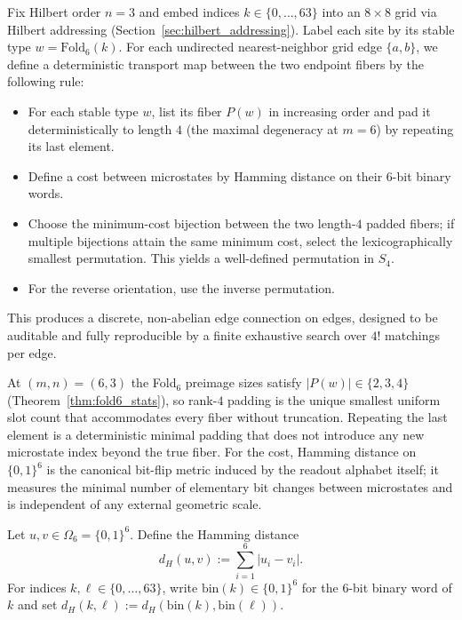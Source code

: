 Fix Hilbert order $n=3$ and embed indices $k\in\{0,\dots,63\}$ into an $8\times 8$ grid via Hilbert addressing (Section~\ref{sec:hilbert_addressing}).
Label each site by its stable type $w=\mathrm{Fold}_6(k)$.
For each undirected nearest-neighbor grid edge $\{a,b\}$, we define a deterministic transport map between the two endpoint fibers by the following rule:
\begin{itemize}
\item For each stable type $w$, list its fiber $P(w)$ in increasing order and pad it deterministically to length $4$ (the maximal degeneracy at $m=6$) by repeating its last element.
\item Define a cost between microstates by Hamming distance on their $6$-bit binary words.
\item Choose the minimum-cost bijection between the two length-$4$ padded fibers; if multiple bijections attain the same minimum cost, select the lexicographically smallest permutation. This yields a well-defined permutation in $S_4$.
\item For the reverse orientation, use the inverse permutation.
\end{itemize}
This produces a discrete, non-abelian edge connection on edges, designed to be auditable and fully reproducible by a finite exhaustive search over $4!$ matchings per edge.

\begin{remark}\label{rem:pad4_hamming_rationale}
At $(m,n)=(6,3)$ the Fold$_6$ preimage sizes satisfy $|P(w)|\in\{2,3,4\}$ (Theorem~\ref{thm:fold6_stats}), so rank-$4$ padding is the unique smallest uniform slot count that accommodates every fiber without truncation.
Repeating the last element is a deterministic minimal padding that does not introduce any new microstate index beyond the true fiber.
For the cost, Hamming distance on $\{0,1\}^6$ is the canonical bit-flip metric induced by the readout alphabet itself; it measures the minimal number of elementary bit changes between microstates and is independent of any external geometric scale.
\end{remark}

\begin{definition}\label{def:hamming_microstates}
Let $u,v\in\Omega_6=\{0,1\}^6$.
Define the Hamming distance
\[
d_H(u,v):=\sum_{i=1}^{6} |u_i-v_i|.
\]
For indices $k,\ell\in\{0,\dots,63\}$, write $\mathrm{bin}(k)\in\{0,1\}^6$ for the $6$-bit binary word of $k$ and set $d_H(k,\ell):=d_H(\mathrm{bin}(k),\mathrm{bin}(\ell))$.
\end{definition}

